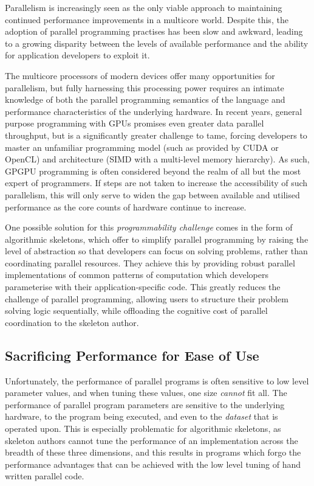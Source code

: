 \documentclass[nonatbib,preprint,11pt]{sigplanconf}
\begin{document}
Parallelism is increasingly seen as the only viable approach to
maintaining continued performance improvements in a multicore world.
Despite this, the adoption of parallel programming practises has been
slow and awkward, leading to a growing disparity between the levels of
available performance and the ability for application developers to
exploit it.

The multicore processors of modern devices offer many opportunities
for parallelism, but fully harnessing this processing power requires
an intimate knowledge of both the parallel programming semantics of
the language and performance characteristics of the underlying
hardware. In recent years, general purpose programming with GPUs
promises even greater data parallel throughput, but is a significantly
greater challenge to tame, forcing developers to master an unfamiliar
programming model (such as provided by CUDA or OpenCL) and
architecture (SIMD with a multi-level memory hierarchy). As such,
GPGPU programming is often considered beyond the realm of all but the
most expert of programmers. If steps are not taken to increase the
accessibility of such parallelism, this will only serve to widen the
gap between available and utilised performance as the core counts of
hardware continue to increase.

One possible solution for this \emph{programmability challenge} comes
in the form of algorithmic skeletons, which offer to simplify parallel
programming by raising the level of abstraction so that developers can
focus on solving problems, rather than coordinating parallel
resources. They achieve this by providing robust parallel
implementations of common patterns of computation which developers
parameterise with their application-specific code. This greatly
reduces the challenge of parallel programming, allowing users to
structure their problem solving logic sequentially, while offloading
the cognitive cost of parallel coordination to the skeleton author.


\subsection{Sacrificing Performance for Ease of Use}

Unfortunately, the performance of parallel programs is often sensitive
to low level parameter values, and when tuning these values, one size
\emph{cannot} fit all. The performance of parallel program parameters
are sensitive to the underlying hardware, to the program being
executed, and even to the \emph{dataset} that is operated upon. This
is especially problematic for algorithmic skeletons, as skeleton
authors cannot tune the performance of an implementation across the
breadth of these three dimensions, and this results in programs which
forgo the performance advantages that can be achieved with the low
level tuning of hand written parallel code.
\end{document}
